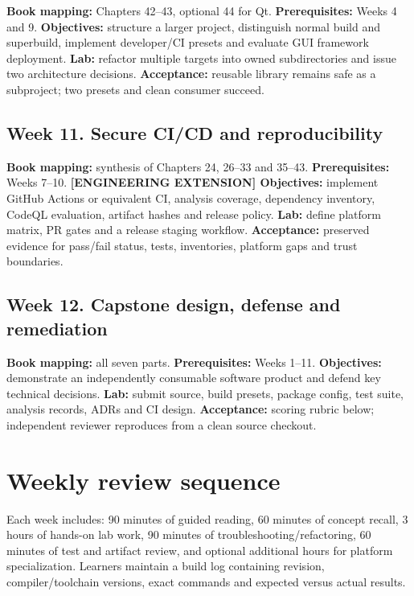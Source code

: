 \documentclass[11pt,letterpaper,oneside]{report}
\begin{document}
\textbf{Book mapping:} Chapters 42--43, optional 44 for Qt.
\textbf{Prerequisites:} Weeks 4 and 9. \textbf{Objectives:} structure a
larger project, distinguish normal build and superbuild, implement
developer/CI presets and evaluate GUI framework deployment.
\textbf{Lab:} refactor multiple targets into owned subdirectories and
issue two architecture decisions. \textbf{Acceptance:} reusable library
remains safe as a subproject; two presets and clean consumer succeed.

\section{Week 11. Secure CI/CD and
reproducibility}\label{week-11.-secure-cicd-and-reproducibility}

\textbf{Book mapping:} synthesis of Chapters 24, 26--33 and 35--43.
\textbf{Prerequisites:} Weeks 7--10. \textbf{{[}ENGINEERING EXTENSION{]}
Objectives:} implement GitHub Actions or equivalent CI, analysis
coverage, dependency inventory, CodeQL evaluation, artifact hashes and
release policy. \textbf{Lab:} define platform matrix, PR gates and a
release staging workflow. \textbf{Acceptance:} preserved evidence for
pass/fail status, tests, inventories, platform gaps and trust
boundaries.

\section{Week 12. Capstone design, defense and
remediation}\label{week-12.-capstone-design-defense-and-remediation}

\textbf{Book mapping:} all seven parts. \textbf{Prerequisites:} Weeks
1--11. \textbf{Objectives:} demonstrate an independently consumable
software product and defend key technical decisions. \textbf{Lab:}
submit source, build presets, package config, test suite, analysis
records, ADRs and CI design. \textbf{Acceptance:} scoring rubric below;
independent reviewer reproduces from a clean source checkout.

\chapter{Weekly review sequence}\label{weekly-review-sequence}

Each week includes: 90 minutes of guided reading, 60 minutes of concept
recall, 3 hours of hands-on lab work, 90 minutes of
troubleshooting/refactoring, 60 minutes of test and artifact review, and
optional additional hours for platform specialization. Learners maintain
a build log containing revision, compiler/toolchain versions, exact
commands and expected versus actual results.
\end{document}

